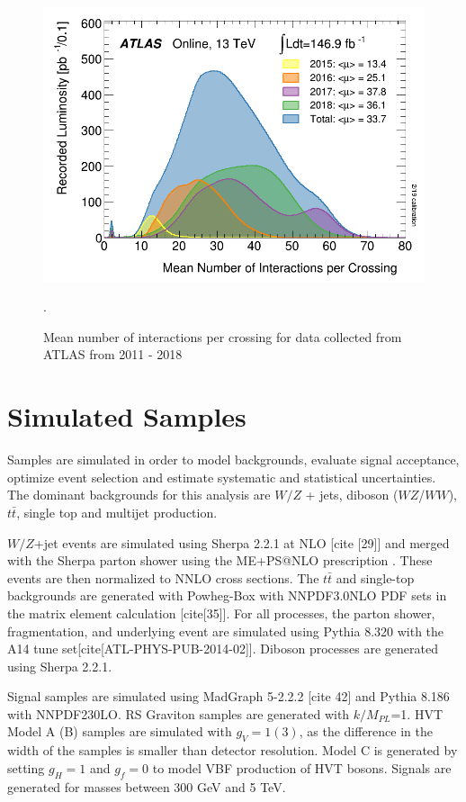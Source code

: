 \begin{figure}[h!]
  \centering
  \includegraphics[width=\hsize]{figures/Analysis/mu_profile.png}
  \caption{Mean number of interactions per crossing for data collected from ATLAS from 2011 - 2018}. 
  \label{fig:mu_profile}
\end{figure} 
\FloatBarrier


\section{Simulated Samples}
Samples are simulated in order to model backgrounds, evaluate signal acceptance, optimize event selection and estimate systematic and statistical uncertainties. The dominant backgrounds for this analysis are $W/Z$ + jets, diboson ($WZ$/$WW$), $t\bar{t}$, single top and multijet production. 

$W/Z$+jet events are simulated using Sherpa 2.2.1 at NLO [cite [29]] and merged with the Sherpa parton shower using the ME+PS@NLO prescription \cite{me_ps}. These events are then normalized to NNLO cross sections. The $t\bar{t}$ and single-top backgrounds are generated with Powheg-Box with NNPDF3.0NLO PDF sets in the matrix element calculation [cite[35]]. For all processes, the parton shower, fragmentation, and underlying event are simulated using Pythia 8.320 with the A14 tune set[cite[ATL-PHYS-PUB-2014-02]]. Diboson processes are generated using Sherpa 2.2.1. 

Signal samples are simulated using MadGraph 5-2.2.2 [cite 42] and Pythia 8.186 with NNPDF230LO. RS Graviton samples are generated with $k/M_{PL}$=1. HVT Model A (B) samples are simulated with $g_{V}=1(3)$, as the difference in the width of the samples is smaller than detector resolution. Model C is generated by setting $g_{H}=1$ and $g_{f}=0$ to model VBF production of HVT bosons. Signals are generated for masses between 300 GeV and 5 TeV.

